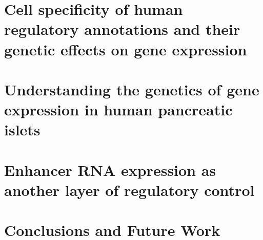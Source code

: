 \documentclass[reqno,12pt,oneside]{report} %
\theoremstyle{plain}
\theoremstyle{definition}
\theoremstyle{remark}
\numberwithin{theorem}{chapter}     %
\begin{document}
\chapter{Cell specificity of human regulatory annotations and their genetic effects on gene expression}
\label{chap:2_regulatory_elements}



\chapter{Understanding the genetics of gene expression in human pancreatic islets}
\label{chap:3_islet_eqtl}



%

\chapter{Enhancer RNA expression as another layer of regulatory control}
\label{chap:cc}


%
 
%

%
% 
%
%
% 
\chapter{Conclusions and Future Work}
\label{chap:conclusion}

 

\startappendices

%
%
 
\startbibliography
 \begin{singlespace} %
% 
 
 \end{singlespace}

%
\end{document}
